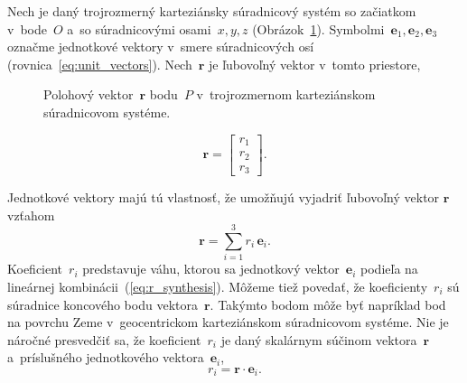 \documentclass[a4paper, 12pt]{book}
\let\vec\mathbf
\begin{document}
Nech je daný trojrozmerný karteziánsky súradnicový systém so začiatkom 
v~bode~$O$ a~so súradnicovými osami~$x, y, z$ (Obrázok~\ref{fig:unit_vectors}).  
Symbolmi~$\vec e_1, \vec e_2, \vec e_3$ označme jednotkové vektory v~smere 
súradnicových osí (rovnica~\ref{eq:unit_vectors}).  Nech~$\vec r$ je ľubovoľný 
vektor v~tomto priestore,
%
\begin{figure}
\centering

\caption{Polohový vektor~$\vec r$ bodu~$P$ v~trojrozmernom karteziánskom 
súradnicovom systéme.}
\label{fig:unit_vectors}
\end{figure}

\begin{equation}
\vec r =
\begin{bmatrix}
r_1\\
r_2\\
r_3
\end{bmatrix}
{.}
\end{equation}

Jednotkové vektory majú tú vlastnosť, že umožňujú vyjadriť ľubovoľný vektor
$\vec r$ vzťahom
%
\begin{equation}
\label{eq:r_synthesis}
\vec r = \sum_{i = 1}^3 r_i \, \vec e_i{.}
\end{equation}
%
Koeficient~$r_i$ predstavuje váhu, ktorou sa jednotkový vektor~$\vec e_i$ 
podieľa na lineárnej kombinácii~(\ref{eq:r_synthesis}).  Môžeme tiež povedať, 
že koeficienty~$r_i$ sú súradnice koncového bodu vektora~$\vec r$.  Takýmto 
bodom môže byť napríklad bod na povrchu Zeme v~geocentrickom karteziánskom 
súradnicovom systéme.  Nie je náročné presvedčiť sa, že koeficient~$r_i$ je 
daný skalárnym súčinom vektora~$\vec r$ a~príslušného jednotkového 
vektora~$\vec e_i$,
%
\begin{equation}
\label{eq:r_analysis}
r_i = \vec r \cdot \vec e_i{.}
\end{equation}
\end{document}
